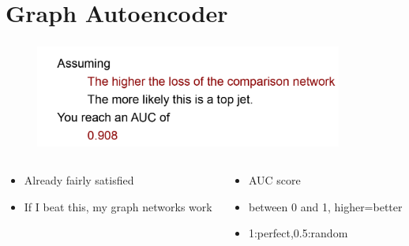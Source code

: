 \documentclass[hyperref={pdfpagelabels=false}]{beamer}
\begin{document}
\newpage
\section{Graph Autoencoder}\label{sec:Graph Autoencoder}

\begin{frame}[label=]
\frametitle{}
\begin{figure}[H] 
  \centering
\includegraphics[width=0.9\textwidth]{../imgs/netresa}
\label{fig:netresa}
  \end{figure}


\begin{columns}[c] %
\begin{column}{0.48\textwidth}%
\begin{itemize}

    \item Already fairly satisfied

    \item If I beat this, my graph networks work


\end{itemize}
\end{column}%
\hfill%
\begin{column}{0.48\textwidth}%
\begin{itemize}

    \item AUC score

    \item between 0 and 1, higher=better

    \item 1:perfect,0.5:random


\end{itemize}
\end{column}%
\hfill%
\end{columns}

\end{frame}





\newpage
\end{document}

